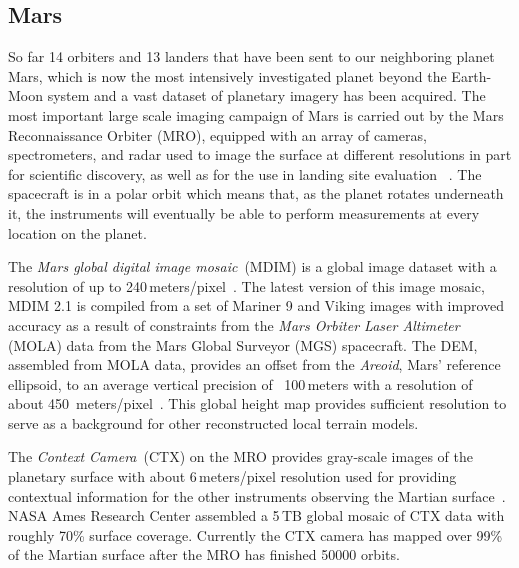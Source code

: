\documentclass[journal]{vgtc}                %
\begin{document}

\subsection{Mars} \label{sec:scenario:mars}
So far 14 orbiters and 13 landers that have been sent to our neighboring planet Mars, which is now the most intensively investigated planet beyond the Earth-Moon system and a vast dataset of planetary imagery has been acquired.
The most important large scale imaging campaign of Mars is carried out by the Mars Reconnaissance Orbiter (MRO), equipped with an array of cameras, spectrometers, and radar used to image the surface at different resolutions in part for scientific discovery, as well as for the use in landing site evaluation ~\cite{zurek2007overview}.
The spacecraft is in a polar orbit which means that, as the planet rotates underneath it, the instruments will eventually be able to perform measurements at every location on the planet.

The \emph{Mars global digital image mosaic}~(MDIM) is a global image dataset with a resolution of up to 240\,meters/pixel~\cite{archinal2003mars}.
The latest version of this image mosaic, MDIM 2.1 is compiled from a set of Mariner 9 and Viking images with improved accuracy as a result of constraints from the \emph{Mars Orbiter Laser Altimeter} (MOLA) data from the Mars Global Surveyor (MGS) spacecraft.
The DEM, assembled from MOLA data, provides an offset from the \emph{Areoid}, Mars' reference ellipsoid, to an average vertical precision of ~100\,meters with a resolution of about 450\, meters/pixel~\cite{smith2001mars}.
This global height map provides sufficient resolution to serve as a background for other reconstructed local terrain models.

The \emph{Context Camera}~(CTX) on the MRO provides gray-scale images of the planetary surface with about 6\,meters/pixel resolution used for providing contextual information for the other instruments observing the Martian surface~\cite{zurek2007overview}.
NASA Ames Research Center assembled a 5\,TB global mosaic of CTX data with roughly 70\% surface coverage.
Currently the CTX camera has mapped over 99\% of the Martian surface after the MRO has finished 50000 orbits.
\end{document}
